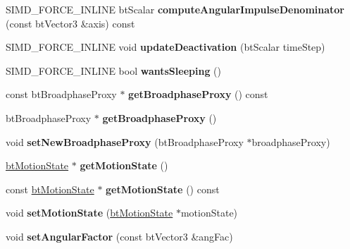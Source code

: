 \begin{DoxyCompactItemize}
S\+I\+M\+D\+\_\+\+F\+O\+R\+C\+E\+\_\+\+I\+N\+L\+I\+NE bt\+Scalar {\bfseries compute\+Angular\+Impulse\+Denominator} (const bt\+Vector3 \&axis) const
\item 
\mbox{\label{classbtRigidBody_aa48bf2e5bf090c613ad8e9aa605bc7df}} 
S\+I\+M\+D\+\_\+\+F\+O\+R\+C\+E\+\_\+\+I\+N\+L\+I\+NE void {\bfseries update\+Deactivation} (bt\+Scalar time\+Step)
\item 
\mbox{\label{classbtRigidBody_aa2ccbd4474fe0edef483533943b5d666}} 
S\+I\+M\+D\+\_\+\+F\+O\+R\+C\+E\+\_\+\+I\+N\+L\+I\+NE bool {\bfseries wants\+Sleeping} ()
\item 
\mbox{\label{classbtRigidBody_a7c6bbab3d998bb33d74272cca8c46375}} 
const bt\+Broadphase\+Proxy $\ast$ {\bfseries get\+Broadphase\+Proxy} () const
\item 
\mbox{\label{classbtRigidBody_a505e4a8179302137cb72f47595404e89}} 
bt\+Broadphase\+Proxy $\ast$ {\bfseries get\+Broadphase\+Proxy} ()
\item 
\mbox{\label{classbtRigidBody_a254399995032d1120492e419f588b28c}} 
void {\bfseries set\+New\+Broadphase\+Proxy} (bt\+Broadphase\+Proxy $\ast$broadphase\+Proxy)
\item 
\mbox{\label{classbtRigidBody_a2bbea712d9095f05ff3b031bbe4e6521}} 
\hyperlink{classbtMotionState}{bt\+Motion\+State} $\ast$ {\bfseries get\+Motion\+State} ()
\item 
\mbox{\label{classbtRigidBody_a5c1b92e131b5648386a7e399f2936df3}} 
const \hyperlink{classbtMotionState}{bt\+Motion\+State} $\ast$ {\bfseries get\+Motion\+State} () const
\item 
\mbox{\label{classbtRigidBody_ac8272055c40ba4bb794fc5f1cb105d54}} 
void {\bfseries set\+Motion\+State} (\hyperlink{classbtMotionState}{bt\+Motion\+State} $\ast$motion\+State)
\item 
\mbox{\label{classbtRigidBody_aa2061f3fd87043f2a3b8c68ee74847cb}} 
void {\bfseries set\+Angular\+Factor} (const bt\+Vector3 \&ang\+Fac)
\item 

\end{DoxyCompactItemize}

